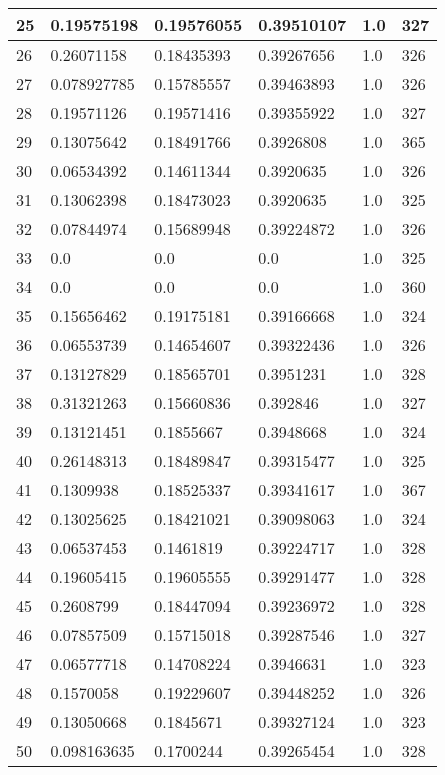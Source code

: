 \begin{longtable}{|l|l|l|l|l|l|}
25 & 0.19575198 & 0.19576055 & 0.39510107 & 1.0 & 327 \\ \hline 
26 & 0.26071158 & 0.18435393 & 0.39267656 & 1.0 & 326 \\ \hline 
27 & 0.078927785 & 0.15785557 & 0.39463893 & 1.0 & 326 \\ \hline 
28 & 0.19571126 & 0.19571416 & 0.39355922 & 1.0 & 327 \\ \hline 
29 & 0.13075642 & 0.18491766 & 0.3926808 & 1.0 & 365 \\ \hline 
30 & 0.06534392 & 0.14611344 & 0.3920635 & 1.0 & 326 \\ \hline 
31 & 0.13062398 & 0.18473023 & 0.3920635 & 1.0 & 325 \\ \hline 
32 & 0.07844974 & 0.15689948 & 0.39224872 & 1.0 & 326 \\ \hline 
33 & 0.0 & 0.0 & 0.0 & 1.0 & 325 \\ \hline 
34 & 0.0 & 0.0 & 0.0 & 1.0 & 360 \\ \hline 
35 & 0.15656462 & 0.19175181 & 0.39166668 & 1.0 & 324 \\ \hline 
36 & 0.06553739 & 0.14654607 & 0.39322436 & 1.0 & 326 \\ \hline 
37 & 0.13127829 & 0.18565701 & 0.3951231 & 1.0 & 328 \\ \hline 
38 & 0.31321263 & 0.15660836 & 0.392846 & 1.0 & 327 \\ \hline 
39 & 0.13121451 & 0.1855667 & 0.3948668 & 1.0 & 324 \\ \hline 
40 & 0.26148313 & 0.18489847 & 0.39315477 & 1.0 & 325 \\ \hline 
41 & 0.1309938 & 0.18525337 & 0.39341617 & 1.0 & 367 \\ \hline 
42 & 0.13025625 & 0.18421021 & 0.39098063 & 1.0 & 324 \\ \hline 
43 & 0.06537453 & 0.1461819 & 0.39224717 & 1.0 & 328 \\ \hline 
44 & 0.19605415 & 0.19605555 & 0.39291477 & 1.0 & 328 \\ \hline 
45 & 0.2608799 & 0.18447094 & 0.39236972 & 1.0 & 328 \\ \hline 
46 & 0.07857509 & 0.15715018 & 0.39287546 & 1.0 & 327 \\ \hline 
47 & 0.06577718 & 0.14708224 & 0.3946631 & 1.0 & 323 \\ \hline 
48 & 0.1570058 & 0.19229607 & 0.39448252 & 1.0 & 326 \\ \hline 
49 & 0.13050668 & 0.1845671 & 0.39327124 & 1.0 & 323 \\ \hline 
50 & 0.098163635 & 0.1700244 & 0.39265454 & 1.0 & 328 \\ \hline 
\end{longtable}